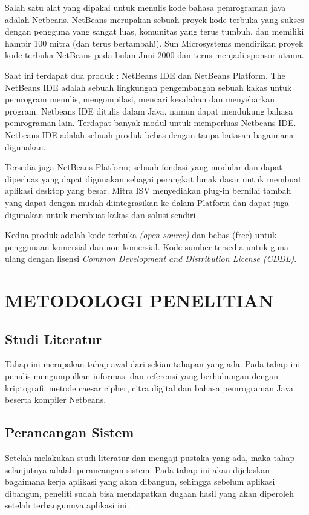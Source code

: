 \documentclass{jtetiproposalskripsi}
\begin{document}
Salah satu alat yang dipakai untuk menulis kode bahasa pemrograman java adalah Netbeans. NetBeans merupakan sebuah proyek kode terbuka yang sukses dengan pengguna yang sangat luas, komunitas yang terus tumbuh, dan memiliki hampir 100 mitra (dan terus bertambah!). Sun Microsystems mendirikan proyek kode terbuka NetBeans pada bulan Juni 2000 dan terus menjadi sponsor utama. 

Saat ini terdapat dua produk : NetBeans IDE dan NetBeans Platform. The NetBeans IDE adalah sebuah lingkungan pengembangan  sebuah kakas untuk pemrogram menulis, mengompilasi, mencari kesalahan dan menyebarkan program. Netbeans IDE ditulis dalam Java, namun dapat mendukung bahasa pemrograman lain. Terdapat banyak modul untuk memperluas Netbeans IDE. Netbeans IDE adalah sebuah produk bebas dengan tanpa batasan bagaimana digunakan. 

Tersedia juga NetBeans Platform; sebuah fondasi yang modular dan dapat diperluas yang dapat digunakan sebagai perangkat lunak dasar untuk membuat aplikasi desktop yang besar. Mitra ISV menyediakan plug-in bernilai tambah yang dapat dengan mudah diintegrasikan ke dalam Platform dan dapat juga digunakan untuk membuat kakas dan solusi sendiri. 

Kedua produk adalah kode terbuka \emph{(open source)} dan bebas (free) untuk penggunaan komersial dan non komersial. Kode sumber tersedia untuk guna ulang dengan lisensi \emph{Common Development and Distribution License (CDDL)}.


\chapter{METODOLOGI PENELITIAN}

\section{Studi Literatur}
Tahap ini merupakan tahap awal dari sekian tahapan yang ada. Pada tahap ini penulis mengumpulkan informasi dan referensi yang berhubungan dengan kriptografi, metode caesar cipher, citra digital dan bahasa pemrograman Java beserta kompiler Netbeans.

\section{Perancangan Sistem}
Setelah melakukan studi literatur dan mengaji pustaka yang ada, maka tahap selanjutnya adalah perancangan sistem. Pada tahap ini akan dijelaskan bagaimana kerja aplikasi yang akan dibangun, sehingga sebelum aplikasi dibangun, peneliti sudah bisa mendapatkan dugaan hasil yang akan diperoleh setelah terbangunnya aplikasi ini.
 
\end{document}
